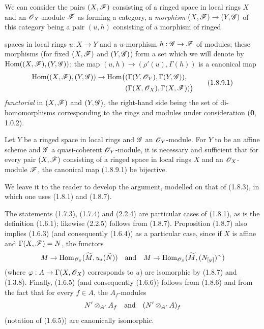 \begin{env}[1.8.9]
\label{ega2:addendum:I.1.8.9}
We can consider the pairs $(X,\mathscr{F})$ consisting of a ringed space
in local rings $X$ and an $\mathscr{O}_X$-module $\mathscr{F}$ as forming
a category, a \emph{morphism} $(X,\mathscr{F})\to(Y,\mathscr{G})$ of this category
being a pair $(u,h)$ consisting of a morphism of ringed
spaces in local rings $u:X\to Y$ and a $u$-morphism
$h:\mathscr{G}\to\mathscr{F}$ of modules; these
morphisms (for fixed $(X,\mathscr{F})$ and $(Y,\mathscr{G})$) form a set
which we will denote by $\operatorname{Hom}((X,\mathscr{F}),(Y,\mathscr{G}))$; the map
$(u,h)\to(\rho'(u),\Gamma(h))$ is a canonical map
\begin{equation}
\label{ega2:addendum:I.1.8.9.1}
\begin{split}
  \operatorname{Hom}((X,\mathscr{F}),(Y,\mathscr{G}))\to
  \operatorname{Hom}\bigl(
    &(\Gamma(Y,\mathscr{O}_Y),\Gamma(Y,\mathscr{G})),\\
    &(\Gamma(X,\mathscr{O}_X),\Gamma(X,\mathscr{F}))
  \bigr)
\end{split}
\tag{1.8.9.1}
\end{equation}
\emph{functorial} in $(X,\mathscr{F})$ and $(Y,\mathscr{G})$, the right-hand side being
the set of di-homomorphisms corresponding to the rings and
modules under consideration (\textbf{0}, 1.0.2).
\end{env}

\begin{corollary}[1.8.10]
\label{ega2:addendum:I.1.8.10}
Let $Y$ be a ringed space in local rings and $\mathscr{G}$ an
$\mathscr{O}_Y$-module. For $Y$ to be an affine scheme and $\mathscr{G}$ a
quasi-coherent $\mathscr{O}_Y$-module, it is necessary and sufficient that for
every pair $(X,\mathscr{F})$ consisting of a ringed space in local rings $X$
and an $\mathscr{O}_X$-module $\mathscr{F}$, the canonical map \textup{(1.8.9.1)} be
bijective.
\end{corollary}

We leave it to the reader to develop the argument, modelled
on that of (1.8.3), in which one uses (1.8.1) and (1.8.7).

\begin{remark}[1.8.11]
\label{ega2:addendum:I.1.8.11}
The statements (1.7.3), (1.7.4) and (2.2.4) are particular
cases of (1.8.1), as is the definition (1.6.1); likewise
(2.2.5) follows from (1.8.7). Proposition (1.8.7) also implies
(1.6.3) (and consequently (1.6.4)) as a particular case, since if $X$
is affine and $\Gamma(X,\mathscr{F})=N$, the functors
\[
  M\to
  \operatorname{Hom}_{\mathscr{O}_S}(\widetilde M,u_*(\widetilde N))
  \quad\hbox{and}\quad
  M\to
  \operatorname{Hom}_{\mathscr{O}_S}(\widetilde M,(N_{[\varphi]})^{\sim})
\]
(where $\varphi:A\to\Gamma(X,\mathscr{O}_X)$ corresponds to $u$) are isomorphic
by (1.8.7) and (1.3.8). Finally, (1.6.5) (and consequently (1.6.6))
follows from (1.8.6) and from the fact that for every $f\in A$, the
$A_f$-modules
\[
  N'\otimes_{A'}A_f
  \quad\hbox{and}\quad
  (N'\otimes_{A'}A)_f
\]
(notation of (1.6.5)) are canonically isomorphic.
\end{remark}


